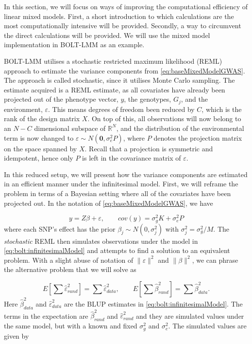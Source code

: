 In this section, we will focus on ways of improving the computational efficiency of linear mixed models. First, a short introduction to which calculations are the most computationally intensive will be provided. Secondly, a way to circumvent the direct calculations will be provided. We will use the mixed model implementation in BOLT-LMM as an example.

BOLT-LMM utilises a stochastic restricted maximum likelihood (REML) approach to estimate the variance components from \cref{eq:baseMixedModelGWAS}. The approach is called stochastic, since it utilises Monte Carlo sampling. The estimate acquired is a REML estimate, as all covariates have already been projected out of the phenotype vector, $ y $, the genotypes, $ G_j $, and the environment, $ \varepsilon $. This means degrees of freedom been reduced by $ C $, which is the rank of the design matrix $ X $. On top of this, all observations will now belong to an $ N-C $ dimensional subspace of $ \mathbb{R}^{N} $, and the distribution of the environmental term is now changed to $ \varepsilon \sim N(\mathbf{0}, \sigma_e^2 P)$, where $ P $ denotes the projection matrix on the space spanned by $ X $. Recall that a projection is symmetric and idempotent, hence only $ P $ is left in the covariance matrix of $ \varepsilon $. 

In this reduced setup, we will present how the variance components are estimated in an efficient manner under the infinitesimal model. First, we will reframe the problem in terms of a Bayesian setting where all of the covariates have been projected out. In the notation of \cref{eq:baseMixedModelGWAS}, we have

\begin{equation}\label{eq:bolt:infinitesimalModel}
y = Z\beta + \varepsilon, \qquad cov(y) = \sigma_g^2 K + \sigma_e^2 P
\end{equation}
where each SNP's effect has the prior $ \beta_j \sim N(0, \sigma_j^2)$ with $\sigma_j^2 = \sigma_g^2 / M $. The \textit{stochastic} REML then simulates observations under the model in \cref{eq:bolt:infinitesimalModel} and attempts to find a solution to an equivalent problem. With a slight abuse of notation of $ \lVert \varepsilon \rVert^2$ and  $ \lVert \beta \rVert^2$, we can phrase the alternative problem that we will solve as

\begin{equation} \label{eq:bolt:AlternativeMMEProblem}
E\left[ \sum \hat{\varepsilon}^2_{rand} \right] = \sum \hat{\varepsilon}^2_{data}, \qquad E\left[ \sum \hat{\beta}^2_{rand} \right] = 
\sum \hat{\beta}^2_{data}.
\end{equation}
Here $ \hat{\beta}^2_{data} $ and $ \hat{\varepsilon}^2_{data} $ are the BLUP estimates in \cref{eq:bolt:infinitesimalModel}. The 
terms in the expectation are $ \hat{\beta}^2_{rand} $ and $ \hat{\varepsilon}^2_{rand} $ and they are simulated values under the same model, but with a known and fixed $ \sigma_g^2 $ and $ \sigma_e^2 $. The simulated values are given by

